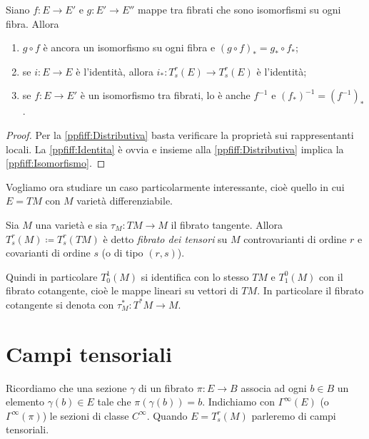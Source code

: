 \begin{proposition} \label{prop:ProprietaPushForwardIsomorfismiFraFibrati}
	Siano $f:E\to E'$ e $g:E' \to E''$ mappe tra fibrati che sono isomorfismi su ogni fibra. Allora
	\begin{enumerate}
		\item $g\circ f$ è ancora un isomorfismo su ogni fibra e $(g\circ f)_* = g_* \circ f_*$; \label{ppfiff:Distributiva}
		\item se $i:E \to E$ è l'identità, allora $i_* : T_s^r(E) \to T_s^r(E)$ è l'identità; \label{ppfiff:Identita}
		\item se $f:E \to E'$ è un isomorfismo tra fibrati, lo è anche $f^{-1}$ e $(f_*)^{-1} = (f^{-1})_*$. \label{ppfiff:Isomorfismo}
	\end{enumerate}
\end{proposition}
\begin{proof}
	Per la \ref{ppfiff:Distributiva} basta verificare la proprietà sui rappresentanti locali. La \ref{ppfiff:Identita} è ovvia e insieme alla \ref{ppfiff:Distributiva} implica la \ref{ppfiff:Isomorfismo}.
\end{proof}

Vogliamo ora studiare un caso particolarmente interessante, cioè quello in cui $E = TM$ con $M$ varietà differenziabile.

\begin{definition} 
	Sia $M$ una varietà e sia $\tau_M : TM \to M$ il fibrato tangente. Allora $T_s^r(M) \coloneqq T_s^r(TM)$ è detto \emph{fibrato dei tensori} su $M$ controvarianti di ordine $r$ e covarianti di ordine $s$ (o di tipo $(r,s)$).
\end{definition}

Quindi in particolare $T_0^1(M)$ si identifica con lo stesso $TM$ e $T_1^0(M)$ con il fibrato cotangente, cioè le mappe lineari su vettori di $TM$.
In particolare il fibrato cotangente si denota con $\tau_M^* : T^*M \to M$. 

\section{Campi tensoriali}

Ricordiamo che una sezione $\gamma$ di un fibrato $\pi : E \to B$ associa ad ogni $b \in B$ un elemento $\gamma(b) \in E$ tale che $\pi(\gamma(b)) = b$.
Indichiamo con $\Gamma^\infty(E)$ (o $\Gamma^\infty(\pi)$) le sezioni di classe $C^\infty$.
Quando $E = T_s^r(M)$ parleremo di campi tensoriali.

